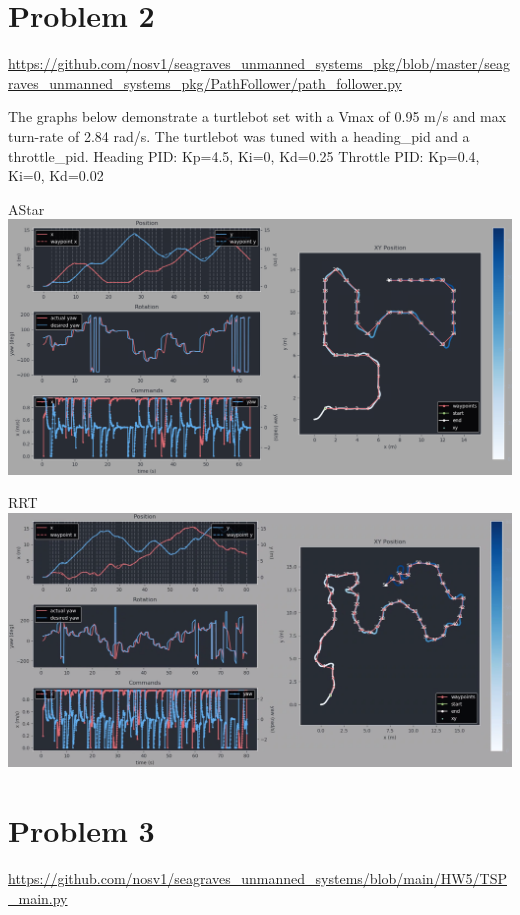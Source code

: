 \documentclass{article}
\begin{document}
    \section*{Problem 2}
    \raggedright
    \url{https://github.com/nosv1/seagraves_unmanned_systems_pkg/blob/master/seagraves_unmanned_systems_pkg/PathFollower/path_follower.py} \break

    The graphs below demonstrate a turtlebot set with a Vmax of 0.95 m/s and max turn-rate of 2.84 rad/s. The turtlebot was tuned with a heading\_pid and a throttle\_pid. \break
    Heading PID: Kp=4.5, Ki=0, Kd=0.25 \break
    Throttle PID: Kp=0.4, Ki=0, Kd=0.02
    \begin{center}
        AStar
        \includegraphics[width=\linewidth]{AStar Turtlebot.png} \break

        RRT
        \includegraphics[width=\linewidth]{RRT Turtlebot.png}
    \end{center}
        
    \section*{Problem 3}
    \url{https://github.com/nosv1/seagraves_unmanned_systems/blob/main/HW5/TSP_main.py}\break
\end{document}
